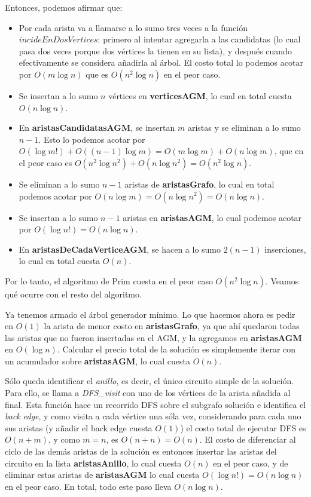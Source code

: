\noindent Entonces, podemos afirmar que:
\begin{itemize}
\item Por cada arista va a llamarse a lo sumo tres veces a la función $incideEnDosVertices$: primero al intentar agregarla a las candidatas (lo cual pasa dos veces porque dos vértices la tienen en su lista), y después cuando efectivamente se considera añadirla al árbol. El costo total lo podemos acotar por $O(m \log n)$ que es $O(n^2 \log n)$ en el peor caso.
\item Se insertan a lo sumo $n$ vértices en \textbf{verticesAGM}, lo cual en total cuesta $O(n \log n)$.
\item En \textbf{aristasCandidatasAGM}, se insertan $m$ aristas y se eliminan a lo sumo $n-1$. Esto lo podemos acotar por $O(\log m!) + O((n-1)\log m) = O(m \log m) + O(n \log m)$, que en el peor caso es $O(n^2 \log n^2) + O(n \log n^2) = O(n^2 \log n)$.
\item Se eliminan a lo sumo $n - 1$ aristas de \textbf{aristasGrafo}, lo cual en total podemos acotar por $O(n \log m) = O(n \log n^2) = O(n \log n)$.
\item Se insertan a lo sumo $n - 1$ aristas en \textbf{aristasAGM}, lo cual podemos acotar por $O(\log n!) = O(n \log n)$.
\item En \textbf{aristasDeCadaVerticeAGM}, se hacen a lo sumo $2(n-1)$ inserciones, lo cual en total cuesta $O(n)$.
\end{itemize}
Por lo tanto, el algoritmo de Prim cuesta en el peor caso $O(n^2 \log n)$. Veamos qué ocurre con el resto del algoritmo.

Ya tenemos armado el árbol generador mínimo. Lo que hacemos ahora es pedir en $O(1)$ la arista de menor costo en \textbf{aristasGrafo}, ya que ahí quedaron todas las aristas que no fueron insertadas en el AGM, y la agregamos en \textbf{aristasAGM} en $O(\log n)$. Calcular el precio total de la solución es simplemente iterar con un acumulador sobre \textbf{aristasAGM}, lo cual cuesta $O(n)$.

Sólo queda identificar el \emph{anillo}, es decir, el único circuito simple de la solución. Para ello, se llama a \emph{DFS\_visit} con uno de los vértices de la arista añadida al final. Esta función hace un recorrido DFS sobre el subgrafo solución e identifica el \emph{back edge}, y como visita a cada vértice una sóla vez, considerando para cada uno sus aristas (y añadir el back edge cuesta $O(1)$) el costo total de ejecutar DFS es $O(n + m)$\cite[p.~606]{cormen}, y como $m = n$, es $O(n + n) = O(n)$. El costo de diferenciar al ciclo de las demás aristas de la solución es entonces insertar las aristas del circuito en la lista \textbf{aristasAnillo}, lo cual cuesta $O(n)$ en el peor caso, y de eliminar estas aristas de \textbf{aristasAGM} lo cual cuesta $O(\log n!) = O(n \log n)$ en el peor caso. En total, todo este paso lleva $O(n \log n)$.

